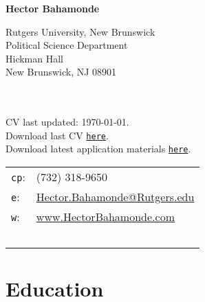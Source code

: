 \documentclass[letterpaper]{article}
\def\name{Hector Bahamonde}
\begin{document}
\centerline{\huge \bf \name}

\vspace{0.25in}

\begin{minipage}{0.45\linewidth}
  Rutgers University, New Brunswick \\
  Political Science Department \\
  Hickman Hall \\
  New Brunswick, NJ 08901\\
  \\
  \\
\begin{footnotesize}
 CV last updated: \today. \\
 Download last CV \href{http://github.com/hbahamonde/Job_Market/raw/master/Bahamonde_CV.pdf}{\texttt{{\color{red}here}}}.\\
 Download latest application materials \href{http://www.hectorbahamonde.com}{\texttt{{\color{red}here}}}.
\end{footnotesize}

\end{minipage}
\begin{minipage}{0.45\linewidth}
  \begin{tabular}{ll}
    \texttt{cp}: & (732) 318-9650 \\
    \texttt{e}: & \href{mailto:hector.bahamonde@rutgers.edu}{Hector.Bahamonde@Rutgers.edu} \\
    \texttt{w}: & \href{http://www.hectorbahamonde.com}{www.HectorBahamonde.com}\\
    \\
    \\
    \\
    \\
    \\
  \end{tabular}
\end{minipage}


\section*{Education}
\end{document}
